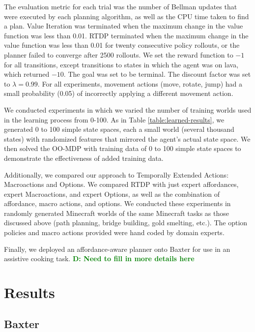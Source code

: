 \documentclass[conference]{IEEEtran}
\newcommand{\dnote}[1]{\textcolor{Green}{\textbf{D: #1}}}
\begin{document}
The evaluation metric for each trial was the
number of Bellman updates that were executed by each planning
algorithm, as well as the CPU time taken to find a plan. Value Iteration was terminated when the maximum change in
the value function was less than 0.01. RTDP terminated when the
maximum change in the value function was less than 0.01 for twenty
consecutive policy rollouts, or the planner failed to converge after 2500 rollouts.
We set the reward function to $-1$ for all transitions, except
transitions to states in which the agent was on lava, which returned 
$-10$. The goal was set to be terminal. The discount
factor was set to $\lambda = 0.99$. For all experiments, movement actions
(move, rotate, jump) had a small probability (0.05) of incorrectly applying a different movement action.

We conducted experiments in which we varied the number of training worlds
used in the learning process from 0-100. As in Table \ref{table:learned-results}, we generated 0 to 100 simple state
spaces, each a small world (several thousand states) with randomized features that mirrored the agent's actual state space. We then solved
the OO-MDP with training data of 0 to 100 simple state spaces to demonstrate the effectiveness of added training data.

Additionally, we compared our approach to Temporally Extended Actions: Macroactions and Options. We compared RTDP with just expert affordances,
expert Macroactions, and expert Options, as well as the combination of affordance, macro actions, and options. We conducted these experiments in randomly generated Minecraft worlds of the same Minecraft tasks as those discussed above (path planning, bridge building, gold smelting, etc.). The option policies and macro actions provided were hand coded by domain experts.

Finally, we deployed an affordance-aware planner onto Baxter for use in an assistive cooking task. \dnote{Need to fill in more details here}

\section{Results}
\label{sec:results}

\subsection{Baxter}
\end{document}
